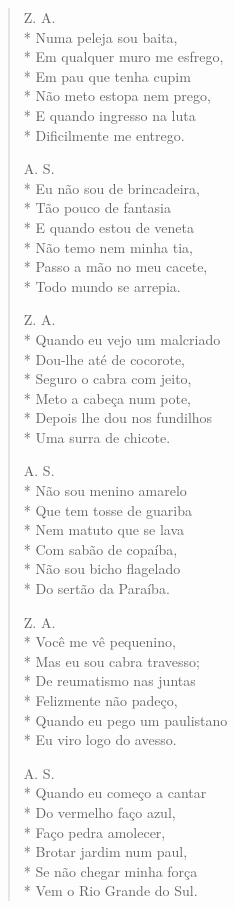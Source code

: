 \begin{verse}
Z. A.\\*
Numa peleja sou baita,\\*
Em qualquer muro me esfrego,\\*
Em pau que tenha cupim\\*
Não meto estopa nem prego,\\*
E quando ingresso na luta\\*
Dificilmente me entrego.

A. S.\\*
Eu não sou de brincadeira,\\*
Tão pouco de fantasia\\*
E quando estou de veneta\\*
Não temo nem minha tia,\\*
Passo a mão no meu cacete,\\*
Todo mundo se arrepia.

Z. A.\\*
Quando eu vejo um malcriado\\*
Dou-lhe até de cocorote,\\*
Seguro o cabra com jeito,\\*
Meto a cabeça num pote,\\*
Depois lhe dou nos fundilhos\\*
Uma surra de chicote.

A. S.\\*
Não sou menino amarelo\\*
Que tem tosse de guariba\\*
Nem matuto que se lava\\*
Com sabão de copaíba,\\*
Não sou bicho flagelado\\*
Do sertão da Paraíba.

Z. A.\\*
Você me vê pequenino,\\*
Mas eu sou cabra travesso;\\*
De reumatismo nas juntas\\*
Felizmente não padeço,\\*
Quando eu pego um paulistano\\*
Eu viro logo do avesso.

A. S.\\*
Quando eu começo a cantar\\*
Do vermelho faço azul,\\*
Faço pedra amolecer,\\*
Brotar jardim num paul,\\*
Se não chegar minha força\\*
Vem o Rio Grande do Sul.


\end{verse}
